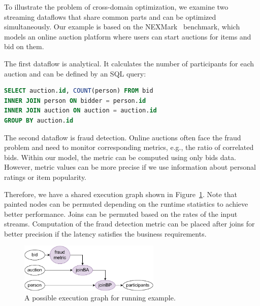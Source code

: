 To illustrate the problem of cross-domain optimization, we examine two streaming dataflows that share common parts and can be optimized simultaneously. Our example is based on the NEXMark~\cite{tucker2008nexmark} benchmark, which models an online auction platform where users can start auctions for items and bid on them.

The first dataflow is analytical. It calculates the number of participants for each auction and can be defined by an SQL query:
\begin{lstlisting}[language=SQL]
SELECT auction.id, COUNT(person) FROM bid
INNER JOIN person ON bidder = person.id
INNER JOIN auction ON auction = auction.id
GROUP BY auction.id
\end{lstlisting}

The second dataflow is fraud detection. Online auctions often face the fraud problem and need to monitor corresponding metrics, e.g., the ratio of correlated bids. Within our model, the metric can be computed using only bids data. However, metric values can be more precise if we use information about personal ratings or item popularity. 

Therefore, we have a shared execution graph shown in Figure~\ref{running_example}. Note that painted nodes can be permuted depending on the runtime statistics to achieve better performance. Joins can be permuted based on the rates of the input streams. Computation of the fraud detection metric can be placed after joins for better precision if the latency satisfies the business requirements.

\begin{figure}[h!]
    \centering
    \includegraphics[width=0.6\textwidth]{images/poster.pdf}
    \caption{A possible execution graph for running example.}
    \label{running_example}
\end{figure}
